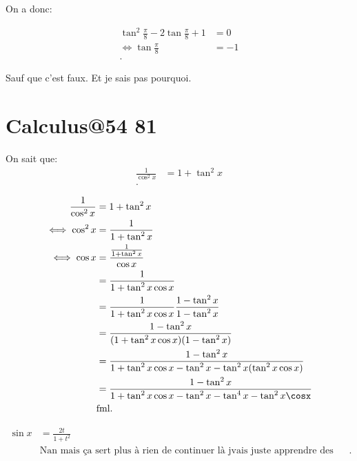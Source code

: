 \documentclass{article}
\begin{document}
On a donc:

\begin{align*}
	\tan^2\frac{\pi}{8} - 2\tan\frac{\pi}{8}+1 &= 0 \\
	\iff \tan\frac{\pi}{8} &= -1 \\
.\end{align*}

Sauf que c'est faux. Et je sais pas pourquoi.

\section{Calculus@54 81} %
On sait que:
\begin{align*}
	\frac{1}{\cos^2x} &= 1+\tan^2x \\
.\end{align*}

\begin{align*}
	\frac{1}{\cos^2x} &= 1+\tan^2x \\
	\iff \cos^2x &= \frac{1}{1+\tan^2x} \\
	\iff \cos x &= \frac{\frac{1}{1+\tan^2x}}{\cos x} \\
	&= \frac{1}{1+\tan^2x\cos x} \\
	&= \frac{1}{1+\tan^2x\cos x} \frac{1-\tan^2x}{1-\tan^2x}\\
	&= \frac{1-\tan^2x}{(1+\tan^2x\cos x)(1-\tan^2x)} \\
	&= \frac{1-\tan^2x}{1+\tan^2x\cos x -\tan^2x -\tan^2x(\tan^2x\cos x)} \\
	&= \frac{1-\tan^2x}{1+\tan^2x \cos x -\tan^2x -\tan^{4}x -\tan^2x \cosx} \\
	&\text{fml}
.\end{align*}

\begin{align*}
	\sin x &= \frac{2t}{1+t^2} \\
	       &\text{Nan mais ça sert plus à rien de continuer là jvais juste apprendre des formules par coeur m\^eme la correction je la comprends pas depuis genre ~10 exos}
.\end{align*}
\end{document}
